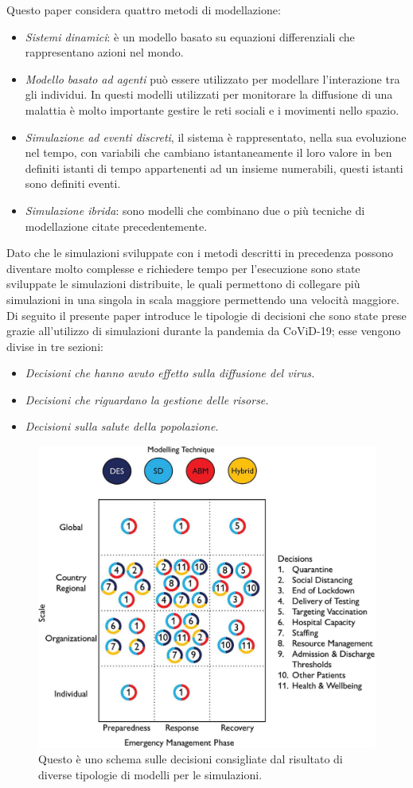 \documentclass[12pt, openany]{book}
\begin{document}
		Questo paper considera quattro metodi di modellazione:
		\begin{itemize}
			\item \emph{Sistemi dinamici}: è un modello basato su equazioni differenziali che rappresentano azioni nel mondo.
			\item \emph{Modello basato ad agenti} può essere utilizzato per modellare l'interazione tra gli individui. In questi modelli utilizzati per monitorare la diffusione di una malattia è molto importante gestire le reti sociali e i movimenti nello spazio.
			\item \emph{Simulazione ad eventi discreti}, il sistema è rappresentato, nella sua evoluzione nel tempo, con variabili che cambiano istantaneamente il loro valore in ben definiti istanti di tempo appartenenti ad un insieme numerabili, questi istanti sono definiti eventi.
			\item \emph{Simulazione ibrida}: sono modelli che combinano due o più tecniche di modellazione citate precedentemente.
		\end{itemize}
	Dato che le simulazioni sviluppate con i metodi descritti in precedenza possono diventare molto complesse e richiedere tempo per l'esecuzione sono state sviluppate le simulazioni distribuite, le quali permettono di collegare più simulazioni in una singola in scala maggiore permettendo una velocità maggiore.\\ 
	Di seguito il presente paper introduce le tipologie di decisioni che sono state prese grazie all'utilizzo di simulazioni durante la pandemia da CoViD-19; esse vengono divise in tre sezioni:
	\begin{itemize}
		\item \emph{Decisioni che hanno avuto effetto sulla diffusione del virus.}
		\item \emph{Decisioni che riguardano la gestione delle risorse.}
		\item \emph{Decisioni sulla salute della popolazione.}
	\end{itemize}
	\begin{figure}[H]
		\centering
		\includegraphics[width=0.8\linewidth]{"Immagini/Decisioni"}
		\caption{Questo è uno schema sulle decisioni consigliate dal risultato di diverse tipologie di modelli per le simulazioni.}
		\label{fig:decisioni}
	\end{figure}
\end{document}

